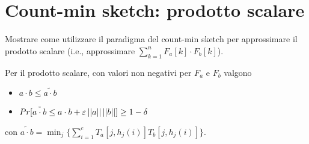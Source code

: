 \chapter{Count-min sketch: prodotto scalare}

\begin{problem*}
    Mostrare come utilizzare il paradigma del count-min sketch per approssimare il
    prodotto scalare (i.e., approssimare \(\sum_{k=1}^n{F_a[k]\cdot F_b[k]}\)).
\end{problem*}

\begin{lemma}[Approssimazione]
    Per il prodotto scalare, con valori non negativi per $F_a$ e $F_b$ valgono
    \begin{itemize}
        \item $a \cdot b \le \tilde{a \cdot b}$
        \item $Pr[\tilde{a \cdot b} \le a \cdot b
            + \varepsilon \left|\left|a\right|\right|\left|\left|b\right|\right|] \ge 1 - \delta$
    \end{itemize}
\end{lemma}

con $\displaystyle \tilde{a \cdot b} = \min_j\{\sum_{i=1}^{c}T_a[j,h_j(i)]T_b[j,h_j(i)]\}$.

